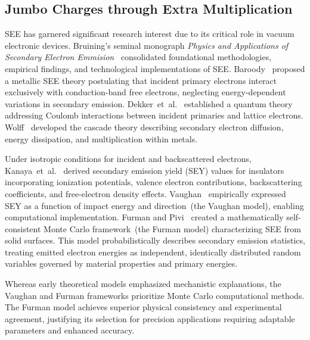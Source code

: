 \subsection{Jumbo Charges through Extra Multiplication}\label{sec:see}
SEE has garnered significant research interest due to its critical role in vacuum electronic devices. Bruining's seminal monograph \textit{Physics and Applications of Secondary Electron Emmision}~\cite{bruining_physics_1954} consolidated foundational methodologies, empirical findings, and technological implementations of SEE. Baroody~\cite{baroody1950theory} proposed a metallic SEE theory postulating that incident primary electrons interact exclusively with conduction-band free electrons, neglecting energy-dependent variations in secondary emission. Dekker~et~al.~\cite{dekker1952theory} established a quantum theory addressing Coulomb interactions between incident primaries and lattice electrons. Wolff~\cite{wolff1954theory} developed the cascade theory describing secondary electron diffusion, energy dissipation, and multiplication within metals.

Under isotropic conditions for incident and backscattered electrons, Kanaya~et~al.~\cite{Kanaya_1978} derived secondary emission yield (SEY) values for insulators incorporating ionization potentials, valence electron contributions, backscattering coefficients, and free-electron density effects. Vaughan~\cite{vaughan} empirically expressed SEY as a function of impact energy and direction~(the Vaughan model), enabling computational implementation. Furman and Pivi~\cite{2002Probabilistic} created a mathematically self-consistent Monte Carlo framework~(the Furman model) characterizing SEE from solid surfaces. This model probabilistically describes secondary emission statistics, treating emitted electron energies as independent, identically distributed random variables governed by material properties and primary energies.

Whereas early theoretical models emphasized mechanistic explanations, the Vaughan and Furman frameworks prioritize Monte Carlo computational methods. The Furman model achieves superior physical consistency and experimental agreement, justifying its selection for precision applications requiring adaptable parameters and enhanced accuracy.

